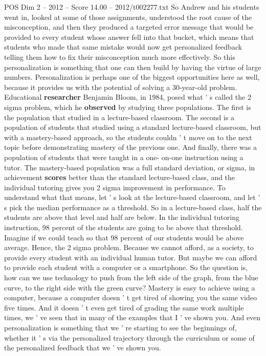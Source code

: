 \begin{textsample}{POS Dim 2 – 2012 – Score 14.00 – 2012/t002277.txt}
So Andrew and his students went in, looked at some of those assignments, understood the root cause of the misconception, and then they produced a targeted error message that would be provided to every student whose answer fell into that bucket, which means that students who made that same mistake would now get personalized feedback telling them how to fix their misconception much more effectively.
So this personalization is something that one can then build by having the virtue of large numbers.
Personalization is perhaps one of the biggest opportunities here as well, because it provides us with the potential of solving a 30-year-old problem.
Educational \textbf{researcher} Benjamin Bloom, in 1984, posed what ' s called the 2 sigma problem, which he \textbf{observed} by studying three populations.
The first is the population that studied in a lecture-based classroom.
The second is a population of students that studied using a standard lecture-based classroom, but with a mastery-based approach, so the students couldn ' t move on to the next topic before demonstrating mastery of the previous one.
And finally, there was a population of students that were taught in a one- on-one instruction using a tutor.
The mastery-based population was a full standard deviation, or sigma, in achievement \textbf{scores} better than the standard lecture-based class, and the individual tutoring gives you 2 sigma improvement in performance.
To understand what that means, let ' s look at the lecture-based classroom, and let ' s pick the median performance as a threshold.
So in a lecture-based class, half the students are above that level and half are below.
In the individual tutoring instruction, 98 percent of the students are going to be above that threshold.
Imagine if we could teach so that 98 percent of our students would be above average.
Hence, the 2 sigma problem.
Because we cannot afford, as a society, to provide every student with an individual human tutor.
But maybe we can afford to provide each student with a computer or a smartphone.
So the question is, how can we use technology to push from the left side of the graph, from the blue curve, to the right side with the green curve?
Mastery is easy to achieve using a computer, because a computer doesn ' t get tired of showing you the same video five times.
And it doesn ' t even get tired of grading the same work multiple times, we ' ve seen that in many of the examples that I ' ve shown you.
And even personalization is something that we ' re starting to see the beginnings of, whether it ' s via the personalized trajectory through the curriculum or some of the personalized feedback that we ' ve shown you.

\end{textsample}
